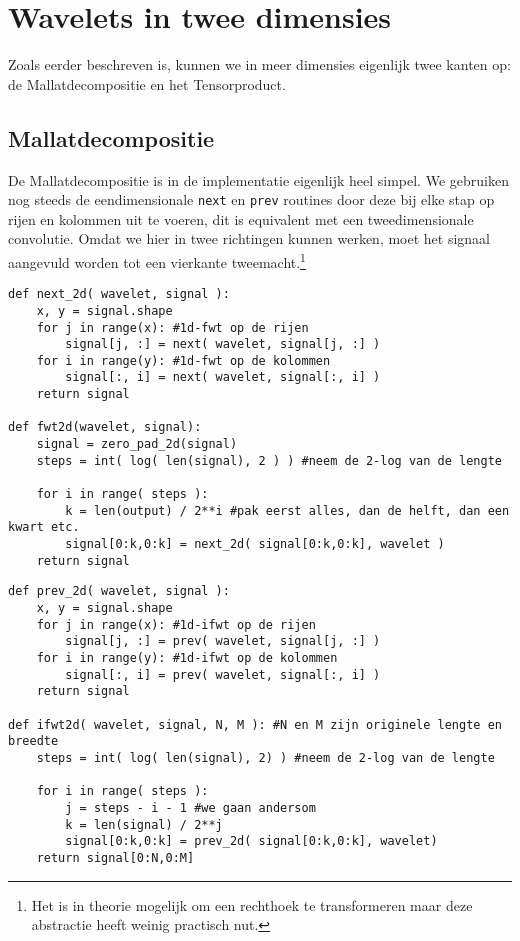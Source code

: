 \section{Wavelets in twee dimensies}
Zoals eerder beschreven is, kunnen we in meer dimensies eigenlijk twee kanten op: de Mallatdecompositie en het Tensorproduct.

\subsection{Mallatdecompositie}
De Mallatdecompositie is in de implementatie eigenlijk heel simpel. We gebruiken nog steeds de eendimensionale \texttt{next} en \texttt{prev} routines door deze bij elke stap op rijen en kolommen uit te voeren, dit is equivalent
met een tweedimensionale convolutie.
Omdat we hier in twee richtingen kunnen werken, moet het signaal aangevuld worden tot een vierkante tweemacht.\footnote{Het is in theorie mogelijk om een rechthoek te transformeren maar deze abstractie heeft weinig practisch nut.}

\begin{lstlisting}[caption=De Mallatdecompositie in 2 dimensies]
def next_2d( wavelet, signal ):
	x, y = signal.shape
	for j in range(x): #1d-fwt op de rijen
		signal[j, :] = next( wavelet, signal[j, :] )
	for i in range(y): #1d-fwt op de kolommen
		signal[:, i] = next( wavelet, signal[:, i] )
	return signal

def fwt2d(wavelet, signal):
	signal = zero_pad_2d(signal)
	steps = int( log( len(signal), 2 ) ) #neem de 2-log van de lengte
	
	for i in range( steps ):
		k = len(output) / 2**i #pak eerst alles, dan de helft, dan een kwart etc.
		signal[0:k,0:k] = next_2d( signal[0:k,0:k], wavelet )
	return signal
\end{lstlisting}
\begin{lstlisting}[caption=De omgekeerde Mallatdecompositie in 2 dimensies]
def prev_2d( wavelet, signal ):
	x, y = signal.shape
	for j in range(x): #1d-ifwt op de rijen
		signal[j, :] = prev( wavelet, signal[j, :] )
	for i in range(y): #1d-ifwt op de kolommen
		signal[:, i] = prev( wavelet, signal[:, i] )
	return signal

def ifwt2d( wavelet, signal, N, M ): #N en M zijn originele lengte en breedte
	steps = int( log( len(signal), 2) ) #neem de 2-log van de lengte
	
	for i in range( steps ):
		j = steps - i - 1 #we gaan andersom
		k = len(signal) / 2**j
		signal[0:k,0:k] = prev_2d( signal[0:k,0:k], wavelet)
	return signal[0:N,0:M]
\end{lstlisting}

